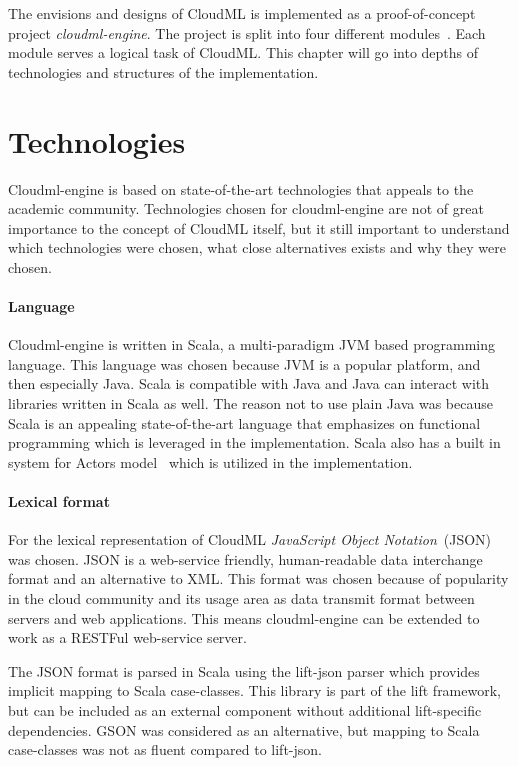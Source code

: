 


The envisions and designs of CloudML is implemented as a proof-of-concept project \emph{cloudml-engine}.
The project is split into four different modules~. 
Each module serves a logical task of CloudML.
This chapter will go into depths of technologies and structures of the implementation.

\section{Technologies}

Cloudml-engine is based on state-of-the-art technologies that appeals to the academic community.
Technologies chosen for cloudml-engine are not of great importance to the concept of CloudML itself,
but it still important to understand which technologies were chosen, what close alternatives exists
and why they were chosen.

\paragraph{Language} 
Cloudml-engine is written in Scala, a multi-paradigm JVM based programming language.
This language was chosen because JVM is a popular platform, and then especially Java.
Scala is compatible with Java and Java can interact with libraries written in Scala as well.
The reason not to use plain Java was because Scala is an appealing state-of-the-art language that emphasizes 
on functional programming which is leveraged in the implementation.
Scala also has a built in system for Actors model~\cite{actors:haller07} which is utilized in the implementation.

\paragraph{Lexical format}
For the lexical representation of CloudML \emph{JavaScript Object Notation}~(JSON) was chosen.
JSON is a web-service friendly, human-readable data interchange format and an alternative to XML.
This format was chosen because of popularity in the cloud community 
and its usage area as data transmit format between servers and web applications.
This means cloudml-engine can be extended to work as a RESTFul web-service server.

The JSON format is parsed in Scala using the lift-json parser which provides implicit
mapping to Scala case-classes. This library is part of the lift framework,
but can be included as an external component without additional lift-specific dependencies.
GSON was considered as an alternative, but mapping to Scala case-classes was not as 
fluent compared to lift-json.

